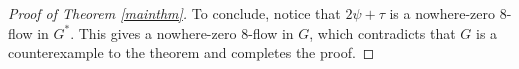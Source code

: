 \documentclass[12pt]{article}
\begin{document}
\begin{proof}[Proof of Theorem \ref{mainthm}]
To conclude, notice that $2\psi + \tau$ is a nowhere-zero 8-flow in $G^*$. This gives a nowhere-zero $8$-flow in $G$, which contradicts that $G$ is a counterexample to the theorem and completes the proof.
\end{proof}



\end{document}

